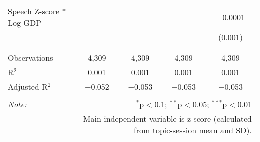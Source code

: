 \begin{table}[!htbp]
\begin{tabular}{@{\extracolsep{5pt}}lcccc}
 Speech Z-score * Log GDP &  &  &  & $-$0.0001 \\ 
  &  &  &  & (0.001) \\ 
  & & & & \\ 
\hline \\[-1.8ex] 
Observations & 4,309 & 4,309 & 4,309 & 4,309 \\ 
R$^{2}$ & 0.001 & 0.001 & 0.001 & 0.001 \\ 
Adjusted R$^{2}$ & $-$0.052 & $-$0.053 & $-$0.053 & $-$0.053 \\ 
\hline 
\hline \\[-1.8ex] 
\textit{Note:}  & \multicolumn{4}{r}{$^{*}$p$<$0.1; $^{**}$p$<$0.05; $^{***}$p$<$0.01} \\ 
 & \multicolumn{4}{r}{Main independent variable is z-score (calculated from topic-session mean and SD).} \\ 
\end{tabular} 
\end{table} 
